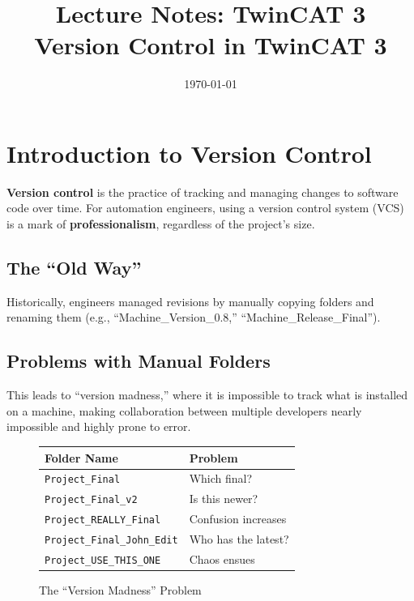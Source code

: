 \documentclass[11pt,a4paper]{article}
\title{
    \vspace{-1cm}
    \textbf{Lecture Notes: TwinCAT 3}\\
    \Large Version Control in TwinCAT 3
}
\author{}
\date{\today}
\begin{document}
\maketitle

\tableofcontents
\newpage

\section{Introduction to Version Control}

\textbf{Version control} is the practice of tracking and managing changes to software code over time. For automation engineers, using a version control system (VCS) is a mark of \textbf{professionalism}, regardless of the project's size.

\subsection{The ``Old Way''}

Historically, engineers managed revisions by manually copying folders and renaming them (e.g., ``Machine\_Version\_0.8,'' ``Machine\_Release\_Final'').

\subsection{Problems with Manual Folders}

This leads to ``version madness,'' where it is impossible to track what is installed on a machine, making collaboration between multiple developers nearly impossible and highly prone to error.

\begin{figure}[h]
\centering
\begin{tabular}{|l|l|}
\hline
\textbf{Folder Name} & \textbf{Problem} \\
\hline
\texttt{Project\_Final} & Which final? \\
\texttt{Project\_Final\_v2} & Is this newer? \\
\texttt{Project\_REALLY\_Final} & Confusion increases \\
\texttt{Project\_Final\_John\_Edit} & Who has the latest? \\
\texttt{Project\_USE\_THIS\_ONE} & Chaos ensues \\
\hline
\end{tabular}
\caption{The ``Version Madness'' Problem}
\end{figure}
\end{document}
